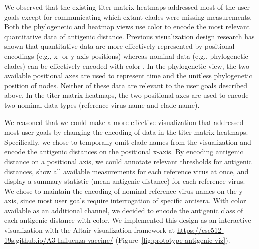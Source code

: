 We observed that the existing titer matrix heatmaps addressed most of the user goals except for communicating which extant clades were missing measurements.
Both the phylogenetic and heatmap views use color to encode the most relevant quantitative data of antigenic distance.
Previous visualization design research has shown that quantitative data are more effectively represented by positional encodings (e.g., x- or y-axis positions) whereas nominal data (e.g., phylogenetic clades) can be effectively encoded with color \citep{Mackinlay1986}.
In the phylogenetic view, the two available positional axes are used to represent time and the unitless phylogenetic position of nodes.
Neither of these data are relevant to the user goals described above.
In the titer matrix heatmaps, the two positional axes are used to encode two nominal data types (reference virus name and clade name).

We reasoned that we could make a more effective visualization that addressed most user goals by changing the encoding of data in the titer matrix heatmaps.
Specifically, we chose to temporally omit clade names from the visualization and encode the antigenic distances on the positional x-axis.
By encoding antigenic distance on a positional axis, we could annotate relevant thresholds for antigenic distances, show all available measurements for each reference virus at once, and display a summary statistic (mean antigenic distance) for each reference virus.
We chose to maintain the encoding of nominal reference virus names on the y-axis, since most user goals require interrogation of specific antisera.
With color available as an additional channel, we decided to encode the antigenic class of each antigenic distance with color.
We implemented this design as an interactive visualization with the Altair visualization framework \citep{VanderPlas2018} at \url{https://cse512-19s.github.io/A3-Influenza-vaccine/} (Figure~\ref{fig:prototype-antigenic-viz}).

